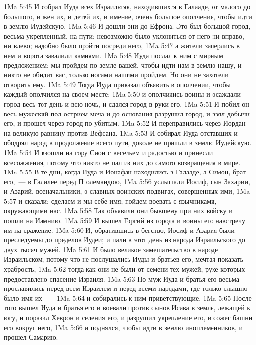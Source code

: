 \vs 1Ma 5:45 И собрал Иуда всех Израильтян, находившихся в Галааде, от малого до большого, и жен их, и детей их, и имение, очень большое ополчение, чтобы идти в землю Иудейскую.
\vs 1Ma 5:46 И дошли они до Ефрона. Это был большой город, весьма укрепленный, на пути; невозможно было уклониться от него ни вправо, ни влево; надобно было пройти посреди него,
\vs 1Ma 5:47 а жители заперлись в нем и ворота завалили камнями.
\vs 1Ma 5:48 Иуда послал к ним с мирным предложением: мы пройдем по земле вашей, чтобы идти нам в землю нашу, и никто не обидит вас, только ногами нашими пройдем. Но они не захотели отворить ему.
\vs 1Ma 5:49 Тогда Иуда приказал объявить в ополчении, чтобы каждый ополчился на своем месте;
\vs 1Ma 5:50 и ополчились воины и осаждали город весь тот день и всю ночь, и сдался город в руки его.
\vs 1Ma 5:51 И побил он весь мужеский пол острием меча и до основания разрушил город, и взял добычи его, и прошел через город по убитым.
\vs 1Ma 5:52 И переправились через Иордан на великую равнину против Вефсана.
\vs 1Ma 5:53 И собирал Иуда отставших и ободрял народ в продолжение всего пути, доколе не пришли в землю Иудейскую.
\vs 1Ma 5:54 И взошли на гору Сион с весельем и радостью и принесли всесожжения, потому что никто не пал из них до самого возвращения в мире.
\rsbpar\vs 1Ma 5:55 В те дни, когда Иуда и Ионафан находились в Галааде, а Симон, брат его,~--- в Галилее перед Птолемаидою,
\vs 1Ma 5:56 услышали Иосиф, сын Захарии, и Азарий, военачальники, о славных воинских подвигах, совершенных ими,
\vs 1Ma 5:57 и сказали: сделаем и мы себе имя; пойдем воевать с язычниками, окружающими нас.
\vs 1Ma 5:58 Так объявили они бывшему при них войску и пошли на Иамнию.
\vs 1Ma 5:59 И вышел Горгий из города и воины его навстречу им на сражение.
\vs 1Ma 5:60 И, обратившись в бегство, Иосиф и Азария были преследуемы до пределов Иудеи; и пали в этот день из народа Израильского до двух тысяч мужей.
\vs 1Ma 5:61 И было великое замешательство в народе Израильском, потому что не послушались Иуды и братьев его, мечтая показать храбрость,
\vs 1Ma 5:62 тогда как они не были от семени тех мужей, руке которых предоставлено спасение Израиля.
\vs 1Ma 5:63 Но муж Иуда и братья его весьма прославились перед всем Израилем и перед всеми народами, где только слышно было имя их,~---
\vs 1Ma 5:64 и собирались к ним приветствующие.
\rsbpar\vs 1Ma 5:65 После того вышел Иуда и братья его и воевали против сынов Исава в земле, лежащей к югу, и поразил Хеврон и селения его, и разрушил укрепление его, и сожег башни его вокруг него,
\vs 1Ma 5:66 и поднялся, чтобы идти в землю иноплеменников, и прошел Самарию.
